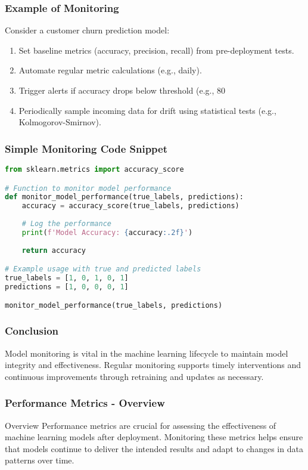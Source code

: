 \documentclass[aspectratio=169]{beamer}
\begin{document}
\begin{frame}[fragile]
    \frametitle{Example of Monitoring}
    Consider a customer churn prediction model:
    \begin{enumerate}
        \item Set baseline metrics (accuracy, precision, recall) from pre-deployment tests.
        \item Automate regular metric calculations (e.g., daily).
        \item Trigger alerts if accuracy drops below threshold (e.g., 80%
        \item Periodically sample incoming data for drift using statistical tests (e.g., Kolmogorov-Smirnov).
    \end{enumerate}
\end{frame}

\begin{frame}[fragile]
    \frametitle{Simple Monitoring Code Snippet}
    \begin{lstlisting}[language=Python]
from sklearn.metrics import accuracy_score

# Function to monitor model performance
def monitor_model_performance(true_labels, predictions):
    accuracy = accuracy_score(true_labels, predictions)
    
    # Log the performance
    print(f'Model Accuracy: {accuracy:.2f}')
    
    return accuracy

# Example usage with true and predicted labels
true_labels = [1, 0, 1, 0, 1]
predictions = [1, 0, 0, 0, 1]

monitor_model_performance(true_labels, predictions)
    \end{lstlisting}
\end{frame}

\begin{frame}[fragile]
    \frametitle{Conclusion}
    Model monitoring is vital in the machine learning lifecycle to maintain model integrity and effectiveness. Regular monitoring supports timely interventions and continuous improvements through retraining and updates as necessary.
\end{frame}

\begin{frame}[fragile]
    \frametitle{Performance Metrics - Overview}
    \begin{block}{Overview}
        Performance metrics are crucial for assessing the effectiveness of machine learning models after deployment. Monitoring these metrics helps ensure that models continue to deliver the intended results and adapt to changes in data patterns over time.
    \end{block}
\end{frame}
\end{document}

